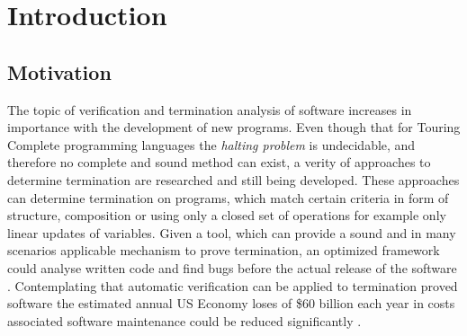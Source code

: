 \chapter{Introduction}

\section{Motivation}
The topic of verification and termination analysis of software increases in importance with the development of new programs. Even though that for Touring Complete programming languages the \textit{halting problem} is undecidable, and therefore no complete and sound method can exist, a verity of approaches to determine termination are researched and still being developed. These approaches can determine termination on programs, which match certain criteria in form of structure, composition or using only a closed set of operations for example only linear updates of variables. \newline
Given a tool, which can provide a sound and in many scenarios applicable mechanism to prove termination, an optimized framework could analyse written code and find bugs before the actual release of the software \cite{verschaetse1993automatic}. Contemplating that automatic verification can be applied to termination proved software the estimated annual US Economy loses of \$60 billion each year in costs associated software maintenance could be reduced significantly \cite{zhivich2009real}. \newline

